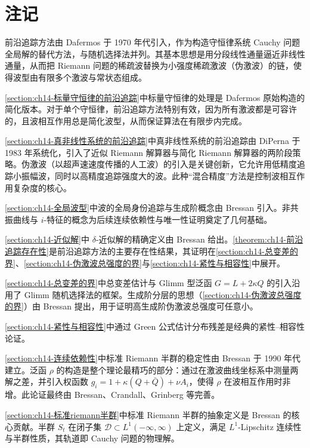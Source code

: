 \documentclass[../../main.tex]{subfiles}
\begin{document}
\section{注记}\label{section:ch14-注}

前沿追踪方法由 Dafermos 于 1970 年代引入，作为构造守恒律系统 Cauchy 问题全局解的替代方法，与随机选择法并列。其基本思想是用分段线性通量逼近非线性通量，从而把 Riemann 问题的稀疏波替换为小强度稀疏激波（伪激波）的链，使得波型由有限多个激波与常状态组成。

\cref{section:ch14-标量守恒律的前沿追踪}中标量守恒律的处理是 Dafermos 原始构造的简化版本。对于单个守恒律，前沿追踪方法特别有效，因为所有激波都是可容许的，且波相互作用总是简化波型，从而保证算法在有限步内完成。

\cref{section:ch14-真非线性系统的前沿追踪}中真非线性系统的前沿追踪由 DiPerna 于 1983 年系统化，引入了近似 Riemann 解算器与简化 Riemann 解算器的两阶段策略。伪激波（以超声速速度传播的人工波）的引入是关键创新，它允许用低精度追踪小振幅波，同时以高精度追踪强度大的波。此种``混合精度''方法是控制波相互作用复杂度的核心。

\cref{section:ch14-全局波型}中波的全局身份追踪与生成阶概念由 Bressan 引入。非共振曲线与 $i$-特征的概念为后续连续依赖性与唯一性证明奠定了几何基础。

\cref{section:ch14-近似解}中 $\delta$-近似解的精确定义由 Bressan 给出。\cref{theorem:ch14-前沿追踪存在性}是前沿追踪方法的主要存在性结果，其证明在\cref{section:ch14-总变差的界}、\cref{section:ch14-伪激波总强度的界}与\cref{section:ch14-紧性与相容性}中展开。

\cref{section:ch14-总变差的界}中总变差估计与 Glimm 型泛函 $G=L+2\kappa Q$ 的引入沿用了 Glimm 随机选择法的框架。生成阶分层的思想（\cref{section:ch14-伪激波总强度的界}）由 Bressan 提出，用于证明高生成阶伪激波总强度可任意小。

\cref{section:ch14-紧性与相容性}中通过 Green 公式估计分布残差是经典的紧性--相容性论证。

\cref{section:ch14-连续依赖性}中标准 Riemann 半群的稳定性由 Bressan 于 1990 年代建立。泛函 $\rho$ 的构造是整个理论最精巧的部分：通过在激波曲线坐标系中测量两解之差，并引入权函数 $g_i=1+\kappa(Q+\bar Q)+\nu A_i$，使得 $\rho$ 在波相互作用时非增。此论证最终由 Bressan、Crandall、Grinberg 等完善。

\cref{section:ch14-标准riemann半群}中标准 Riemann 半群的抽象定义是 Bressan 的核心贡献。半群 $S_t$ 在闭子集 $\mathscr{D}\subset L^1(-\infty,\infty)$ 上定义，满足 $L^1$-Lipschitz 连续性与半群性质，其轨道即 Cauchy 问题的物理解。
\end{document}

